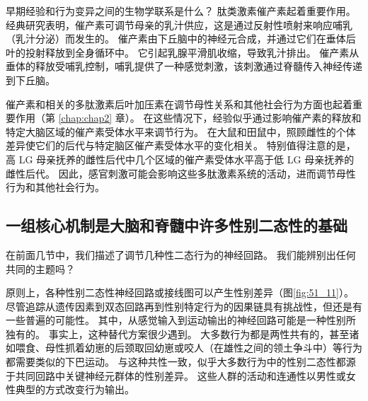 早期经验和行为变异之间的生物学联系是什么？ 肽类激素催产素起着重要作用。 经典研究表明，催产素可调节母亲的乳汁供应，这是通过反射性喷射来响应哺乳（乳汁分泌）而发生的。 催产素由下丘脑中的神经元合成，并通过它们在垂体后叶的投射释放到全身循环中。 它引起乳腺平滑肌收缩，导致乳汁排出。 催产素从垂体的释放受哺乳控制，哺乳提供了一种感觉刺激，该刺激通过脊髓传入神经传递到下丘脑。

催产素和相关的多肽激素后叶加压素在调节母性关系和其他社会行为方面也起着重要作用（第 \ref{chap:chap2} 章）。 在这些情况下，经验似乎通过影响催产素的释放和特定大脑区域的催产素受体水平来调节行为。 在大鼠和田鼠中，照顾雌性的个体差异使它们的后代与特定脑区催产素受体水平的变化相关。 特别值得注意的是，高 LG 母亲抚养的雌性后代中几个区域的催产素受体水平高于低 LG 母亲抚养的雌性后代。 因此，感官刺激可能会影响这些多肽激素系统的活动，进而调节母性行为和其他社会行为。

\subsection{一组核心机制是大脑和脊髓中许多性别二态性的基础}

在前面几节中，我们描述了调节几种性二态行为的神经回路。 我们能辨别出任何共同的主题吗？

原则上，各种性别二态性神经回路或接线图可以产生性别差异（图\ref{fig:51_11}）。 尽管追踪从遗传因素到双态回路再到性别特定行为的因果链具有挑战性，但还是有一些普遍的可能性。 其中，从感觉输入到运动输出的神经回路可能是一种性别所独有的。 事实上，这种替代方案很少遇到。 大多数行为都是两性共有的，甚至诸如喂食、母性抓着幼崽的后颈取回幼崽或咬人（在雄性之间的领土争斗中）等行为都需要类似的下巴运动。 与这种共性一致，似乎大多数行为中的性别二态性都源于共同回路中关键神经元群体的性别差异。 这些人群的活动和连通性以男性或女性典型的方式改变行为输出。

